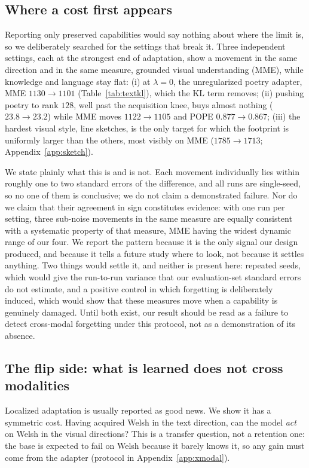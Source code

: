 \documentclass{article}
\begin{document}
\subsection{Where a cost first appears}
\label{sec:boundary}
Reporting only preserved capabilities would say nothing about where the limit
is, so we deliberately searched for the settings that break it. Three
independent settings, each at the strongest end of adaptation, show a movement
in the same direction and in the same measure, grounded visual understanding
(MME), while knowledge and language stay flat:
(i) at $\lambda=0$, the unregularized poetry adapter, MME $1130\to1101$
(Table~\ref{tab:textkl}), which the KL term removes;
(ii) pushing poetry to rank $128$, well past the acquisition knee, buys almost
nothing ($23.8\to23.2$) while MME moves $1122\to1105$ and POPE $0.877\to0.867$;
(iii) the hardest visual style, line sketches, is the only target for which the
footprint is uniformly larger than the others, most visibly on MME
($1785\to1713$; Appendix~\ref{app:sketch}).

We state plainly what this is and is not. Each movement individually lies within
roughly one to two standard errors of the difference, and all runs are
single-seed, so no one of them is conclusive; we do not claim a demonstrated
failure. Nor do we claim that their agreement in sign constitutes evidence: with
one run per setting, three sub-noise movements in the same measure are equally
consistent with a systematic property of that measure, MME having the widest
dynamic range of our four. We report the pattern because it is the only signal
our design produced, and because it tells a future study where to look, not
because it settles anything. Two things would settle it, and neither is present
here: repeated seeds, which would give the run-to-run variance that our
evaluation-set standard errors do not estimate, and a positive control in which
forgetting is deliberately induced, which would show that these measures move
when a capability is genuinely damaged. Until both exist, our result should be
read as a failure to detect cross-modal forgetting under this protocol, not as a
demonstration of its absence.

\subsection{The flip side: what is learned does not cross modalities}
Localized adaptation is usually reported as good news. We show it has a
symmetric cost. Having acquired Welsh in the text direction, can the model
\emph{act} on Welsh in the visual directions? This is a transfer question, not a
retention one: the base is expected to fail on Welsh because it barely knows it,
so any gain must come from the adapter (protocol in Appendix~\ref{app:xmodal}).
\end{document}
